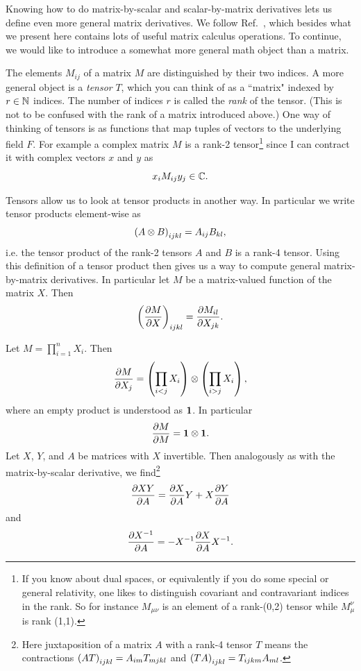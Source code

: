 Knowing how to do matrix-by-scalar and scalar-by-matrix derivatives
lets us define even more general matrix derivatives. 
We follow Ref.~\cite{kamleh_hybrid_2004}, which besides what we present
here contains lots of useful matrix calculus operations.
To continue, we would like
to introduce a somewhat more general math object than a matrix.

The elements $M_{ij}$ of a matrix $M$ are distinguished by their two indices.
A more general object is a {\it tensor} $T$, which you can think
of as a ``matrix" indexed by $r\in\mathbb{N}$ indices. The number of indices $r$
is called the {\it rank} of the tensor. (This is not to be
confused with the rank of a matrix introduced above.) One way of thinking of
tensors is as functions that map tuples of vectors to the underlying field $F$.
For example a complex matrix $M$ is a rank-2 tensor\footnote{If you know about
dual spaces, or equivalently if you do some special or general relativity,
one likes to distinguish covariant and contravariant indices
in the rank. So for instance $M_{\mu\nu}$ is an element of a rank-(0,2)
tensor while $M_\mu^\nu$ is rank (1,1).}
since I can contract it with complex vectors $x$ and $y$ as
\begin{equation}
x_i M_{ij} y_j \in\mathbb{C}.
\end{equation}

Tensors allow us to look at tensor products in another way. In particular
we write tensor products element-wise as
\begin{equation}
\left(A\otimes B\right)_{ijkl}=A_{ij}B_{kl},
\end{equation}
i.e. the tensor product of the rank-2 tensors $A$ and $B$ is a rank-4 tensor.
Using this definition of a tensor product then gives us a way to compute
general matrix-by-matrix derivatives. In
particular let $M$ be a matrix-valued function of the matrix $X$.
Then
\begin{equation}
\left(\pdv{M}{X}\right)_{ijkl}=\pdv{M_{il}}{X_{jk}}.
\end{equation}

\begin{proposition}{}{}
Let $M=\prod_{i=1}^n X_i$. Then
$$ \pdv{M}{X_j}=\left(\prod_{i<j}X_i\right)\otimes\left(\prod_{i>j}X_i\right), $$
where an empty product is understood as ${\mathbf 1}$. In particular
$$ \pdv{M}{M}={\mathbf 1}\otimes{\mathbf 1}. $$
Let $X$, $Y$, and $A$ be matrices with $X$ invertible.
Then analogously as with the matrix-by-scalar
derivative, we find\footnote{Here juxtaposition of a matrix $A$ with
a rank-4 tensor $T$ means the contractions $\left(AT\right)_{ijkl}=A_{im}T_{mjkl}$
and $\left(TA\right)_{ijkl}=T_{ijkm}A_{ml}$.}
$$
\pdv{XY}{A}=\pdv{X}{A}Y+X\pdv{Y}{A}
$$
and
$$
\pdv{X^{-1}}{A}=-X^{-1}\pdv{X}{A}X^{-1}.
$$
\end{proposition}


